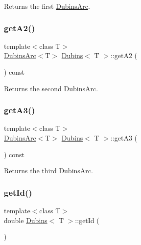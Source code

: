 Returns the first {\ttfamily \mbox{\hyperlink{class_dubins_arc}{Dubins\+Arc}}}. 

\mbox{\label{class_dubins_a0291f2dc5b8225c0d85013d42749dd4b}} 
\subsubsection{\texorpdfstring{getA2()}{getA2()}}
{\footnotesize\ttfamily template$<$class T$>$ \\
\mbox{\hyperlink{class_dubins_arc}{Dubins\+Arc}}$<$T$>$ \mbox{\hyperlink{class_dubins}{Dubins}}$<$ T $>$\+::get\+A2 (\begin{DoxyParamCaption}{ }\end{DoxyParamCaption}) const\hspace{0.3cm}{\ttfamily [inline]}}



Returns the second {\ttfamily \mbox{\hyperlink{class_dubins_arc}{Dubins\+Arc}}}. 

\mbox{\label{class_dubins_ae128ed13582151a7bd99c772c96d0402}} 
\subsubsection{\texorpdfstring{getA3()}{getA3()}}
{\footnotesize\ttfamily template$<$class T$>$ \\
\mbox{\hyperlink{class_dubins_arc}{Dubins\+Arc}}$<$T$>$ \mbox{\hyperlink{class_dubins}{Dubins}}$<$ T $>$\+::get\+A3 (\begin{DoxyParamCaption}{ }\end{DoxyParamCaption}) const\hspace{0.3cm}{\ttfamily [inline]}}



Returns the third {\ttfamily \mbox{\hyperlink{class_dubins_arc}{Dubins\+Arc}}}. 

\mbox{\label{class_dubins_a5781212ce32e684018104d2c0676ceb6}} 
\subsubsection{\texorpdfstring{getId()}{getId()}}
{\footnotesize\ttfamily template$<$class T$>$ \\
double \mbox{\hyperlink{class_dubins}{Dubins}}$<$ T $>$\+::get\+Id (\begin{DoxyParamCaption}{ }\end{DoxyParamCaption})\hspace{0.3cm}{\ttfamily [inline]}}



